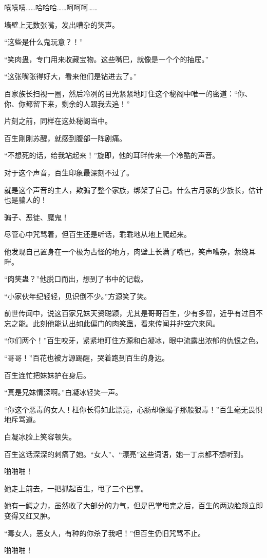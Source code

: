 \begin{this_body}
嘻嘻嘻……哈哈哈……呵呵呵……

墙壁上无数张嘴，发出嘈杂的笑声。

“这些是什么鬼玩意？！”

“笑肉蛊，专门用来收藏宝物。这些嘴巴，就像是一个个的抽屉。”

“这张嘴张得好大，看来他们是钻进去了。”

百家族长扫视一圈，然后冷冽的目光紧紧地盯住这个秘阁中唯一的密道：“你、你、你都留下来，剩余的人跟我去追！”

片刻之前，同样在这处秘阁当中。

百生刚刚苏醒，就感到腹部一阵剧痛。

“不想死的话，给我站起来！”旋即，他的耳畔传来一个冷酷的声音。

对于这个声音，百生印象最深刻不过了。

就是这个声音的主人，欺骗了整个家族，绑架了自己。什么古月家的少族长，估计也是骗人的！

骗子、恶徒、魔鬼！

尽管心中咒骂着，但百生还是听话，乖乖地从地上爬起来。

他发现自己置身在一个极为古怪的地方，肉壁上长满了嘴巴，笑声嘈杂，萦绕耳畔。

“肉笑蛊？”他脱口而出，想到了书中的记载。

“小家伙年纪轻轻，见识倒不少。”方源笑了笑。

前世传闻中，说这百家兄妹天资聪颖，尤其是哥哥百生，少有多智，近乎有过目不忘之能。此刻他能认出如此偏门的肉笑蛊，看来传闻并非空穴来风。

“你们两个！”百生咬牙，紧紧地盯住方源和白凝冰，眼中流露出浓郁的仇恨之色。

“哥哥！”百花也被方源踢醒，哭着跑到百生的身边。

百生连忙把妹妹护在身后。

“真是兄妹情深啊。”白凝冰轻笑一声。

“你这个恶毒的女人！枉你长得如此漂亮，心肠却像蝎子那般狠毒！”百生毫无畏惧地斥骂道。

白凝冰脸上笑容顿失。

百生这话深深的刺痛了她。“女人”、“漂亮”这些词语，她一丁点都不想听到。

啪啪啪！

她走上前去，一把抓起百生，甩了三个巴掌。

她有一鳄之力，虽然收了大部分的力气，但是巴掌甩完之后，百生的两边脸颊立即变得又红又肿。

“毒女人，恶女人，有种的你杀了我吧！”但百生仍旧咒骂不止。

啪啪啪！


\end{this_body}
